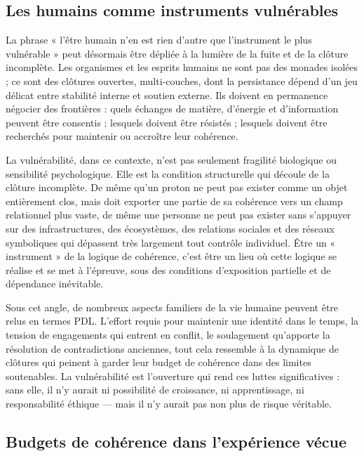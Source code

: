 \documentclass[11pt,a4paper]{article}
\theoremstyle{definition}
\begin{document}
\subsection{Les humains comme instruments vulnérables}

La phrase « l’être humain n’en est rien d’autre que l’instrument le plus vulnérable » peut désormais être dépliée à la lumière de la fuite et de la clôture incomplète. Les organismes et les esprits humains ne sont pas des monades isolées ; ce sont des clôtures ouvertes, multi-couches, dont la persistance dépend d’un jeu délicat entre stabilité interne et soutien externe.\cite{Laubscher_Existence_PulsatingClosure_2026} Ils doivent en permanence négocier des frontières : quels échanges de matière, d’énergie et d’information peuvent être consentis ; lesquels doivent être résistés ; lesquels doivent être recherchés pour maintenir ou accroître leur cohérence.

La vulnérabilité, dans ce contexte, n’est pas seulement fragilité biologique ou sensibilité psychologique. Elle est la condition structurelle qui découle de la clôture incomplète. De même qu’un proton ne peut pas exister comme un objet entièrement clos, mais doit exporter une partie de sa cohérence vers un champ relationnel plus vaste, de même une personne ne peut pas exister sans s’appuyer sur des infrastructures, des écosystèmes, des relations sociales et des réseaux symboliques qui dépassent très largement tout contrôle individuel.\cite{Laubscher_UniversalCoherenceLeakage_2024,Laubscher_PDL_TO_Dialogue_2024} Être un « instrument » de la logique de cohérence, c’est être un lieu où cette logique se réalise et se met à l’épreuve, sous des conditions d’exposition partielle et de dépendance inévitable.

Sous cet angle, de nombreux aspects familiers de la vie humaine peuvent être relus en termes PDL. L’effort requis pour maintenir une identité dans le temps, la tension de engagements qui entrent en conflit, le soulagement qu’apporte la résolution de contradictions anciennes, tout cela ressemble à la dynamique de clôtures qui peinent à garder leur budget de cohérence dans des limites soutenables.\cite{Laubscher_Existence_PulsatingClosure_2026} La vulnérabilité est l’ouverture qui rend ces luttes significatives : sans elle, il n’y aurait ni possibilité de croissance, ni apprentissage, ni responsabilité éthique — mais il n’y aurait pas non plus de risque véritable.

\subsection{Budgets de cohérence dans l'expérience vécue}
\end{document}
